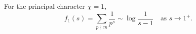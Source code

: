 For the principal character $\chi = 1$,
$$
f_1(s) = \sum_{p \nmid m} \frac{1}{p^s} \sim \log\frac{1}{s-1} \quad \text{as } s \to 1^+.
$$
